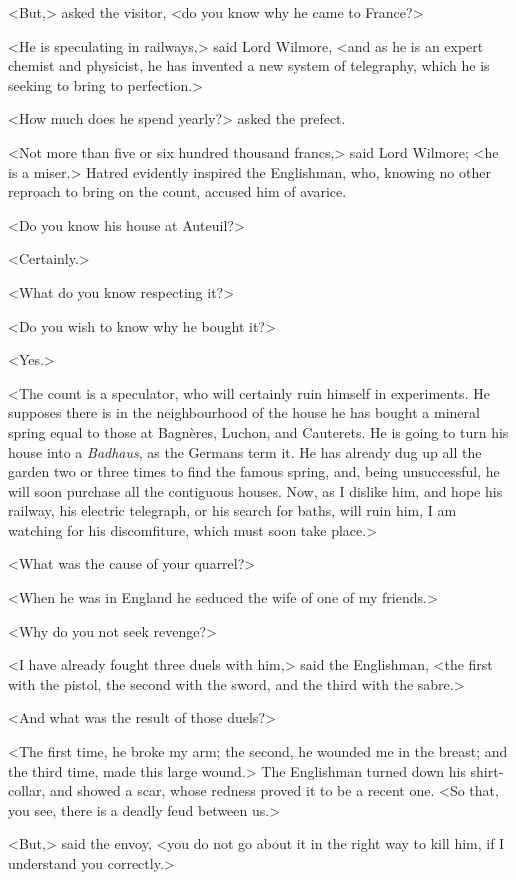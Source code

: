  <But,> asked the visitor, <do you know why he came to France?> 

 <He is speculating in railways,> said Lord Wilmore, <and as he is an expert chemist and physicist, he has invented a new system of telegraphy, which he is seeking to bring to perfection.> 

 <How much does he spend yearly?> asked the prefect. 

 <Not more than five or six hundred thousand francs,> said Lord Wilmore; <he is a miser.> Hatred evidently inspired the Englishman, who, knowing no other reproach to bring on the count, accused him of avarice. 

 <Do you know his house at Auteuil?> 

 <Certainly.> 

 <What do you know respecting it?> 

 <Do you wish to know why he bought it?> 

 <Yes.> 

 <The count is a speculator, who will certainly ruin himself in experiments. He supposes there is in the neighbourhood of the house he has bought a mineral spring equal to those at Bagnères, Luchon, and Cauterets. He is going to turn his house into a \textit{Badhaus}, as the Germans term it. He has already dug up all the garden two or three times to find the famous spring, and, being unsuccessful, he will soon purchase all the contiguous houses. Now, as I dislike him, and hope his railway, his electric telegraph, or his search for baths, will ruin him, I am watching for his discomfiture, which must soon take place.> 

 <What was the cause of your quarrel?> 

 <When he was in England he seduced the wife of one of my friends.> 

 <Why do you not seek revenge?> 

 <I have already fought three duels with him,> said the Englishman, <the first with the pistol, the second with the sword, and the third with the sabre.> 

 <And what was the result of those duels?> 

 <The first time, he broke my arm; the second, he wounded me in the breast; and the third time, made this large wound.> The Englishman turned down his shirt-collar, and showed a scar, whose redness proved it to be a recent one. <So that, you see, there is a deadly feud between us.> 

 <But,> said the envoy, <you do not go about it in the right way to kill him, if I understand you correctly.> 


